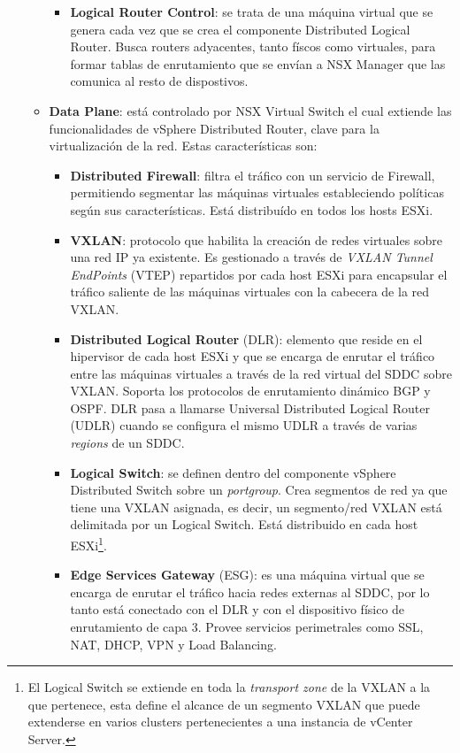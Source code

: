 \begin{itemize}
\begin{itemize}
\begin{itemize}

                \item \textbf{Logical Router Control}: se trata de una máquina virtual que se genera cada vez que se crea el componente Distributed Logical Router. Busca routers adyacentes, tanto físcos como virtuales, para formar tablas de enrutamiento que se envían a NSX Manager que las comunica al resto de dispostivos.
            \end{itemize}
        \item \textbf{Data Plane}: está controlado por NSX Virtual Switch el cual extiende las funcionalidades de vSphere Distributed Router, clave para la virtualización de la red. Estas características son:
            \begin{itemize}
                \item \textbf{Distributed Firewall}: filtra el tráfico con un servicio de Firewall, permitiendo segmentar las máquinas virtuales estableciendo políticas según sus características. Está distribuído en todos los hosts ESXi.
                \item \textbf{VXLAN}: protocolo que habilita la creación de redes virtuales sobre una red IP ya existente. Es gestionado a través de \textit{VXLAN Tunnel EndPoints} (VTEP) repartidos por cada host ESXi para encapsular el tráfico saliente de las máquinas virtuales con la cabecera de la red VXLAN.
                \item \textbf{Distributed Logical Router} (DLR): elemento que reside en el hipervisor de cada host ESXi y que se encarga de enrutar el tráfico entre las máquinas virtuales a través de la red virtual del SDDC sobre VXLAN. Soporta los protocolos de enrutamiento dinámico BGP y OSPF. DLR pasa a llamarse Universal Distributed Logical Router (UDLR) cuando se configura el mismo UDLR a través de varias \textit{regions} de un SDDC.
                \item \textbf{Logical Switch}: se definen dentro del componente vSphere Distributed Switch sobre un \textit{portgroup}. Crea segmentos de red ya que tiene una VXLAN asignada, es decir, un segmento/red VXLAN está delimitada por un Logical Switch. Está distribuido en cada host ESXi\footnote{El Logical Switch se extiende en toda la \textit{transport zone} de la VXLAN a la que pertenece, esta define el alcance de un segmento VXLAN que puede extenderse en varios clusters pertenecientes a una instancia de vCenter Server.}.
                \item \textbf{Edge Services Gateway} (ESG): es una máquina virtual que se encarga de enrutar el tráfico hacia redes externas al SDDC, por lo tanto está conectado con el DLR y con el dispositivo físico de enrutamiento de capa 3. Provee servicios perimetrales como SSL, NAT, DHCP, VPN y Load Balancing.
            \end{itemize}
    \end{itemize}
    

\end{itemize}
